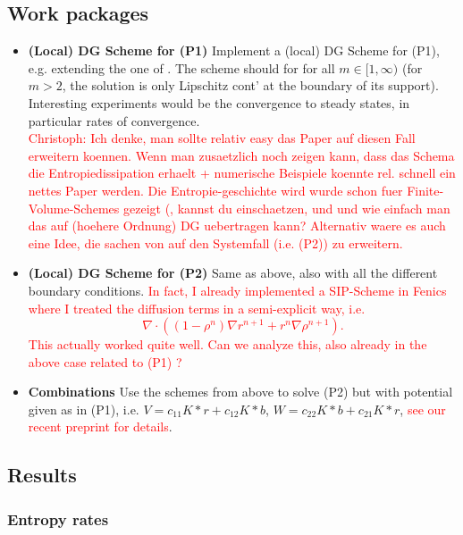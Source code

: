 \documentclass[11pt,a4paper]{article}
\theoremstyle{definition}
\numberwithin{equation}{section}
\newcommand{\rr}[1]{\textcolor{red}{#1}}
\begin{document}
\subsection*{Work packages}
\begin{itemize}
 \item\textbf{(Local) DG Scheme for (P1)} Implement a (local) DG Scheme for (P1), e.g. extending the one of \cite{}. The scheme should for for all $m \in [1,\infty)$ (for $m>2$, the solution is only Lipschitz cont' at the boundary of its support). Interesting experiments would be the convergence to steady states, in particular rates of convergence.\\
 \rr{Christoph: Ich denke,  man sollte relativ easy das Paper \cite{Zhang2009} auf diesen Fall erweitern koennen. Wenn man zusaetzlich noch zeigen kann, dass das Schema die Entropiedissipation erhaelt + numerische Beispiele koennte rel. schnell ein nettes Paper werden. Die Entropie-geschichte wird wurde schon fuer Finite-Volume-Schemes gezeigt (\cite{Bessemoulin2012,Carrillo_Chertock_Huang_2015}, kannst du einschaetzen, und und wie einfach man das auf (hoehere Ordnung) DG uebertragen kann? Alternativ waere es auch eine Idee, die sachen von \cite{Carrillo_Chertock_Huang_2015} auf den Systemfall (i.e. (P2)) zu erweitern.}
 
 \item\textbf{(Local) DG Scheme for (P2)} Same as above, also with all the different boundary conditions. \rr{In fact, I already implemented a SIP-Scheme in Fenics where I treated the diffusion terms in a semi-explicit way, i.e.
 $$
 \nabla\cdot ((1-\rho^n)\nabla r^{n+1} + r^n\nabla \rho^{n+1}).
 $$
 This actually worked quite well. Can we analyze this, also already in the above case related to (P1) ?}
 
 \item\textbf{Combinations} Use the schemes from above to solve (P2) but with potential given as in (P1), i.e. $V=c_{11} K\ast r + c_{12}K\ast b$, $W=c_{22} K\ast b + c_{21}K\ast r$, \rr{see our recent preprint \cite{Berendsen2016} for details}.
 
\end{itemize}

\subsection*{Results}
\subsubsection*{Entropy rates}
\end{document}
